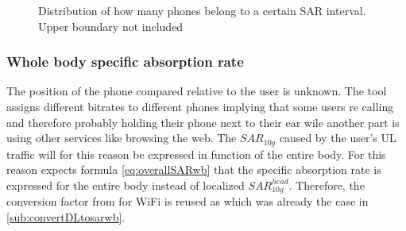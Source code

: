 \begin{figure}
  \caption{Distribution of how many phones belong to a certain SAR interval. Upper boundary not included}
  \label{chart:germanDatabase}
\end{figure}


\subsubsection{Whole body specific absorption rate}
The position of the phone compared relative to the user is unknown. The tool assigns different bitrates to different phones implying 
that some users re calling and therefore probably holding their phone next to their ear wile another part is using other services like browsing the web.
The $SAR_{10g}$ caused by the user's \gls{UL} traffic will for this reason be expressed in function of the entire body.
For this reason expects formula \ref{eq:overallSARwb} that the specific absorption rate is expressed for the entire body instead of localized $SAR^{head}_{10g}$.
Therefore, the conversion factor from \cite{J22_plets2015joint} for WiFi is reused as which was already the case in \ref{sub:convertDLtosarwb}.

